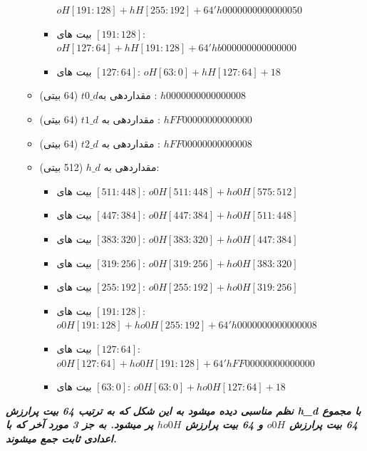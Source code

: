 \begin{itemize}
\begin{itemize}
\begin{itemize}
	      	      	      $	oH[191:128] + hH[255:192] + 
	      	      	      64'h0000000000000050$
	      	      	\item
	      	      	      بیت های $[191:128]$:	
	      	      	      $oH[127: 64] + hH[191:128] + 64'hb000000000000000$
	      	      	\item
	      	      	      بیت های $[127:64]$:
	      	      	  $    	oH[ 63:  0] + hH[127: 64] + 18$
	      	      \end{itemize}
	      	\item
	      	      مقداردهی به$ t0\_d$ (64 بیتی) : $h0000000000000008$
	      	\item
	      	      مقداردهی به $t1\_d$ (64 بیتی) : $hFF00000000000000$
	      	\item
	      	      مقداردهی به $t2\_d$ (64 بیتی) : $hFF00000000000008$
	      	\item
	      	      مقداردهی به $h\_d$ (512 بیتی):
	      	      \begin{itemize}
	      	      	\item
	      	      	      بیت های $[511:448]$:
	      	      	      $ 	o0H[511:448] + ho0H[575:512]$
      	      	    \item
	      	      	      بیت های $[447:384]$:  
	      	      	      	$o0H[447:384] + ho0H[511:448]$
	      	      	\item
	      	      	      بیت های $[383:320]$:
	      	      	      $	o0H[383:320] + ho0H[447:384]$
	      	      	\item
	      	      	      بیت های $[319:256]$:
	      	      	      $	o0H[319:256] + ho0H[383:320]$
	      	      	\item
	      	      	      بیت های $[255:192]$:
	      	      	      $	o0H[255:192] + ho0H[319:256]$
	      	      	\item
	      	      	      بیت های $[191:128]$:	
	      	      	      $o0H[191:128] + ho0H[255:192] + 64'h0000000000000008$
	      	      	\item
	      	      	      بیت های $[127:64]$:	
	      	      	      $o0H[127: 64] + ho0H[191:128] + 64'hFF00000000000000$
	      	      	\item
	      	      	      بیت های $[63:0]$:	
	      	      	      $	o0H[ 63:  0] + ho0H[127: 64] + 18$
	      	      	 
	      	      \end{itemize}
	      \end{itemize}
\end{itemize}
\textit{
	\textbf{نظم مناسبی دیده میشود به این شکل که به ترتیب 64 بیت پرارزش h\_d با مجموع 64 بیت پرارزش $o0H$ و 64 بیت پرارزش $ho0H$ پر میشود. به جز 3 مورد آخر که با اعدادی ثابت جمع میشوند.
}}

